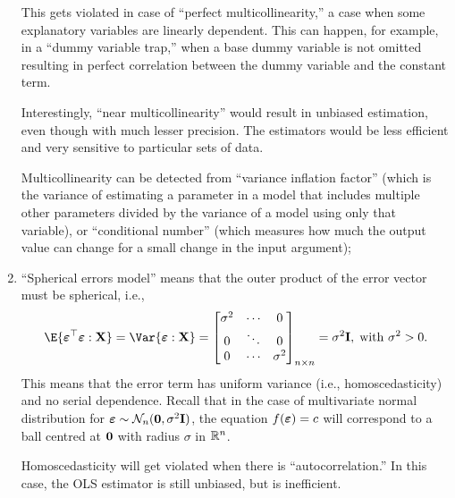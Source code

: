 \begin{enumerate}[(1)]
          This gets violated in case of ``perfect multicollinearity,''
          a case when some explanatory variables are linearly dependent. This
          can happen, for example, in a ``dummy variable trap,''
          when a base dummy variable is not omitted resulting in perfect correlation
          between the dummy variable and the constant term.

          Interestingly, ``near multicollinearity''
          would result in unbiased estimation, even though with much lesser precision.
          The estimators would be less efficient and very sensitive to particular sets of data.

          Multicollinearity can be detected from ``variance inflation factor''
          (which is the variance of estimating a parameter in a model that includes
          multiple other parameters divided by the variance of a model using only that variable),
          or ``conditional number'' (which measures how much the output value can change for a small change
          in the input argument);
    \item ``Spherical errors model'' means that the outer product of the error
          vector must be spherical, i.e.,
          \[ \E{\Vector{\varepsilon}^\top \Vector{\varepsilon}\given \Matrix{X}}
              =\Var{\Vector{\varepsilon}\given \Matrix{X}}=
              \begin{bmatrix}
                  \sigma^2 & \cdots & 0        \\
                  0        & \ddots & 0        \\
                  0        & \cdots & \sigma^2
              \end{bmatrix}_{n\times n}=\sigma^2 \Matrix{I},\;\text{with } \sigma^2>0. \]
          This means that the error term has uniform variance (i.e.,
          homoscedasticity) and no serial dependence. Recall
          that in the case of multivariate normal distribution
          for $ {\boldsymbol \varepsilon}\sim\mathcal{N}_n({\boldsymbol 0},\sigma^2 \mathbf{I}) $,
          the equation $ f({\boldsymbol \varepsilon})=c $ will correspond to a ball
          centred at $ {\boldsymbol 0} $ with radius $ \sigma $ in $ \mathbb{R}^n $.

          Homoscedasticity will get violated when there is ``autocorrelation.''
          In this case, the OLS estimator is still unbiased, but is inefficient.


\end{enumerate}
